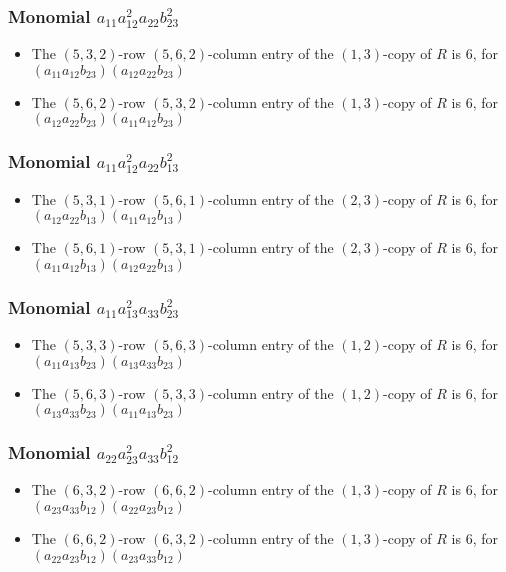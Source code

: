 \documentclass{article}
\begin{document}
\subsubsection{Monomial $ a_{11} a_{12}^{2} a_{22} b_{23}^{2} $}

\begin{itemize}
\item The $(5, 3, 2)$-row $(5, 6, 2)$-column entry of the $ \left(1, 3\right) $-copy of $R$ is $ 6 $, for $( a_{11} a_{12} b_{23} )( a_{12} a_{22} b_{23} )$ 
\item The $(5, 6, 2)$-row $(5, 3, 2)$-column entry of the $ \left(1, 3\right) $-copy of $R$ is $ 6 $, for $( a_{12} a_{22} b_{23} )( a_{11} a_{12} b_{23} )$ 
\end{itemize}
\subsubsection{Monomial $ a_{11} a_{12}^{2} a_{22} b_{13}^{2} $}

\begin{itemize}
\item The $(5, 3, 1)$-row $(5, 6, 1)$-column entry of the $ \left(2, 3\right) $-copy of $R$ is $ 6 $, for $( a_{12} a_{22} b_{13} )( a_{11} a_{12} b_{13} )$ 
\item The $(5, 6, 1)$-row $(5, 3, 1)$-column entry of the $ \left(2, 3\right) $-copy of $R$ is $ 6 $, for $( a_{11} a_{12} b_{13} )( a_{12} a_{22} b_{13} )$ 
\end{itemize}
\subsubsection{Monomial $ a_{11} a_{13}^{2} a_{33} b_{23}^{2} $}

\begin{itemize}
\item The $(5, 3, 3)$-row $(5, 6, 3)$-column entry of the $ \left(1, 2\right) $-copy of $R$ is $ 6 $, for $( a_{11} a_{13} b_{23} )( a_{13} a_{33} b_{23} )$ 
\item The $(5, 6, 3)$-row $(5, 3, 3)$-column entry of the $ \left(1, 2\right) $-copy of $R$ is $ 6 $, for $( a_{13} a_{33} b_{23} )( a_{11} a_{13} b_{23} )$ 
\end{itemize}
\subsubsection{Monomial $ a_{22} a_{23}^{2} a_{33} b_{12}^{2} $}

\begin{itemize}
\item The $(6, 3, 2)$-row $(6, 6, 2)$-column entry of the $ \left(1, 3\right) $-copy of $R$ is $ 6 $, for $( a_{23} a_{33} b_{12} )( a_{22} a_{23} b_{12} )$ 
\item The $(6, 6, 2)$-row $(6, 3, 2)$-column entry of the $ \left(1, 3\right) $-copy of $R$ is $ 6 $, for $( a_{22} a_{23} b_{12} )( a_{23} a_{33} b_{12} )$ 
\end{itemize}
\end{document}
